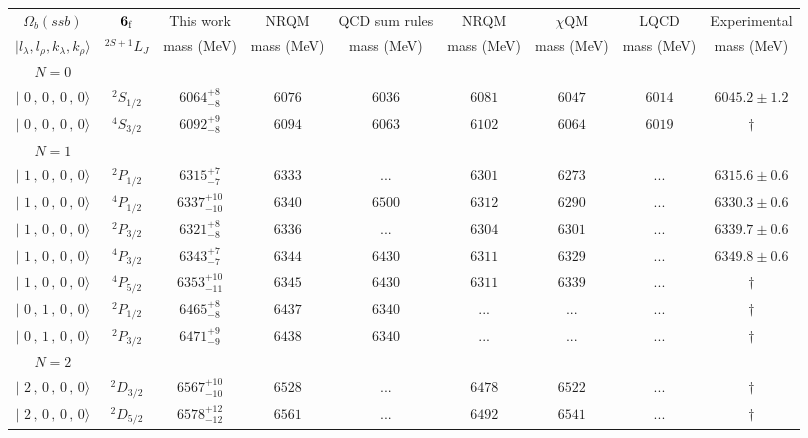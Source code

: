 \begin{tabular}{c c| c c c c c c c}\hline \hline
$\Omega_{b}(ssb)$& ${\bf {6}}_{\rm f}$& This work   &   NRQM \cite{Yoshida2015}     &  QCD sum rules \cite{Liu2008, Mao2015, Chen2016}      &  NRQM \cite{Roberts2008}    & $\chi$QM \cite{Kim2021}        & LQCD \cite{Mohanta2020}     & Experimental  \\ 
 $\vert l_{\lambda}, l_{\rho}, k_{\lambda}, k_{\rho} \rangle$ & $^{2S+1}L_{J}$ & mass (MeV)  &   mass (MeV)  &  mass (MeV)  &  mass (MeV) & mass (MeV) & mass (MeV) &      mass (MeV) \\ \hline
\hline
 $N=0$  &  &  &  &  &  \\ 
$\vert \,\,0\,,\,0\,,\,0\,,\,0 \rangle $ & $^{2}S_{1/2}$ & $6064^{+8}_{-8}$ & $6076$ & $6036$ & $6081$ & $6047$ & $6014$ & $6045.2\pm 1.2$ \\ 
$\vert \,\,0\,,\,0\,,\,0\,,\,0 \rangle $ & $^{4}S_{3/2}$ & $6092^{+9}_{-8}$ & $6094$ & $6063$ & $6102$ & $6064$ & $6019$ & $\dagger$ \\ 
\hline
 $N=1$  &  &  &  &  &  \\ 
$\vert \,\,1\,,\,0\,,\,0\,,\,0 \rangle $ & $^{2}P_{1/2}$ & $6315^{+7}_{-7}$ & $6333$ & ... & $6301$ & $6273$ & ... & $6315.6\pm 0.6$ \\ 
$\vert \,\,1\,,\,0\,,\,0\,,\,0 \rangle $ & $^{4}P_{1/2}$ & $6337^{+10}_{-10}$ & $6340$ & $6500$ & $6312$ & $6290$ & ... & $6330.3\pm 0.6$ \\ 
$\vert \,\,1\,,\,0\,,\,0\,,\,0 \rangle $ & $^{2}P_{3/2}$ & $6321^{+8}_{-8}$ & $6336$ & ... & $6304$ & $6301$ & ... & $6339.7\pm 0.6$ \\ 
$\vert \,\,1\,,\,0\,,\,0\,,\,0 \rangle $ & $^{4}P_{3/2}$ & $6343^{+7}_{-7}$ & $6344$ & $6430$ & $6311$ & $6329$ & ... & $6349.8\pm 0.6$ \\ 
$\vert \,\,1\,,\,0\,,\,0\,,\,0 \rangle $ & $^{4}P_{5/2}$ & $6353^{+10}_{-11}$ & $6345$ & $6430$ & $6311$ & $6339$ & ... & $\dagger$ \\ 
$\vert \,\,0\,,\,1\,,\,0\,,\,0 \rangle $ & $^{2}P_{1/2}$ & $6465^{+8}_{-8}$ & $6437$ & $6340$ & ... & ... & ... & $\dagger$ \\ 
$\vert \,\,0\,,\,1\,,\,0\,,\,0 \rangle $ & $^{2}P_{3/2}$ & $6471^{+9}_{-9}$ & $6438$ & $6340$ & ... & ... & ... & $\dagger$ \\ 
\hline
 $N=2$  &  &  &  &  &  \\ 
$\vert \,\,2\,,\,0\,,\,0\,,\,0 \rangle $ & $^{2}D_{3/2}$ & $6567^{+10}_{-10}$ & $6528$ & ... & $6478$ & $6522$ & ... & $\dagger$ \\ 
$\vert \,\,2\,,\,0\,,\,0\,,\,0 \rangle $ & $^{2}D_{5/2}$ & $6578^{+12}_{-12}$ & $6561$ & ... & $6492$ & $6541$ & ... & $\dagger$ \\ 

\end{tabular}
